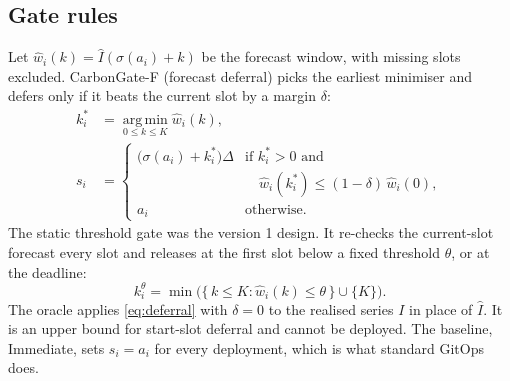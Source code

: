 \documentclass[journal]{IEEEtran}
\begin{document}
\subsection{Gate rules}
Let $\hat w_i(k) = \hat I(\sigma(a_i)+k)$ be the forecast window, with missing slots excluded. CarbonGate-F (forecast deferral) picks the earliest minimiser and defers only if it beats the current slot by a margin $\delta$:
\begin{equation}
\begin{aligned}
k_i^\ast &= \operatorname*{arg\,min}_{0 \le k \le K} \hat w_i(k),\\
s_i &= \begin{cases} \big(\sigma(a_i)+k_i^\ast\big)\Delta & \text{if } k_i^\ast > 0 \text{ and}\\
 & \quad \hat w_i(k_i^\ast) \le (1-\delta)\,\hat w_i(0),\\
 a_i & \text{otherwise.}\end{cases}
\end{aligned}
\label{eq:deferral}
\end{equation}
The static threshold gate was the version 1 design. It re-checks the current-slot forecast every slot and releases at the first slot below a fixed threshold $\theta$, or at the deadline:
\begin{equation}
k_i^{\theta} = \min\Big(\{\, k \le K : \hat w_i(k) \le \theta \,\} \cup \{K\}\Big).
\label{eq:threshold}
\end{equation}
The oracle applies \eqref{eq:deferral} with $\delta = 0$ to the realised series $I$ in place of $\hat I$. It is an upper bound for start-slot deferral and cannot be deployed. The baseline, Immediate, sets $s_i = a_i$ for every deployment, which is what standard GitOps does.
\end{document}
